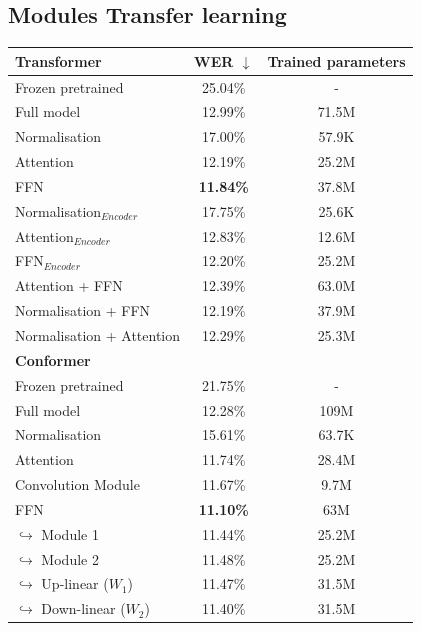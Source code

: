 \subsection{Modules Transfer learning}
\begin{table}
    \begin{center}
        \begin{tabular}{lcc}\hline
            \textbf{Transformer}    & WER  $\downarrow$   & Trained parameters \\ \hline
            Frozen pretrained & 25.04\% & -   \\
            Full model   & 12.99\% & 71.5M   \\ \hline
            Normalisation & 17.00\% & 57.9K  \\
            Attention & 12.19\% & 25.2M  \\
            FFN    & \textbf{11.84\%}     &  37.8M \\ \hline
            Normalisation$_{Encoder}$ & 17.75\% & 25.6K \\ 
            Attention$_{Encoder}$ & 12.83\% & 12.6M \\ 
            FFN$_{Encoder}$ & 12.20\% & 25.2M \\ \hline 
            Attention + FFN & 12.39\% & 63.0M \\
            Normalisation + FFN & 12.19\% & 37.9M \\
            Normalisation + Attention & 12.29\% & 25.3M\\ \hline \hline
            \textbf{Conformer}    &     & \\ \hline
            Frozen pretrained & 21.75\% & -   \\
            Full model   & 12.28\% & 109M   \\ \hline
            Normalisation & 15.61\% & 63.7K  \\
            Attention & 11.74\% & 28.4M  \\
            Convolution Module & 11.67\% & 9.7M \\
            FFN    & \textbf{11.10\%}     &  63M \\
            \quad $\hookrightarrow$ Module 1    & 11.44\%     &  25.2M \\
            \quad $\hookrightarrow$ Module 2    & 11.48\%     &  25.2M \\
            \quad $\hookrightarrow$ Up-linear ($W_1$)    & 11.47\%     &  31.5M \\
            \quad $\hookrightarrow$ Down-linear ($W_2$)    & 11.40\%     &  31.5M \\ \hline

\end{tabular}
\end{center}
\end{table}
